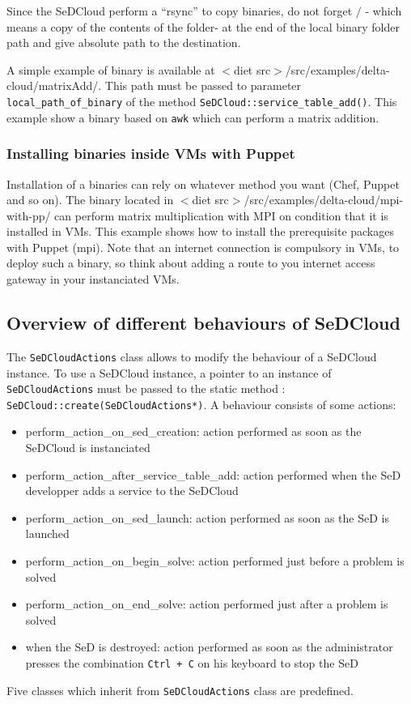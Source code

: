 Since the SeDCloud perform a ``rsync'' to copy binaries, do not forget
$/$ - which means a copy of the contents of the folder- at the end of
the local binary folder path and give absolute path to the
destination.

A simple example of binary is available at $<$diet
src$>$/src/examples/delta-cloud/matrixAdd/. This path must be passed
to parameter \texttt{local\_path\_of\_binary} of the method
\texttt{SeDCloud::service\_table\_add()}. This example show a binary
based on \texttt{awk} which can perform a matrix addition.

\subsubsection{Installing binaries inside VMs with Puppet}

Installation of a binaries can rely on whatever method you want (Chef,
Puppet and so on). The binary located in $<$diet
src$>$/src/examples/delta-cloud/mpi-with-pp/ can perform matrix
multiplication with MPI on condition that it is installed in VMs.
This example shows how to install the prerequisite packages with
Puppet (mpi). Note that an internet connection is compulsory in VMs,
to deploy such a binary, so think about adding a route to you internet
access gateway in your instanciated VMs.



\subsection{Overview of different behaviours of SeDCloud\label{sec:SeDCloudActions}}



The \texttt{SeDCloudActions} class allows to modify the behaviour of a
SeDCloud instance. To use a SeDCloud instance, a pointer to an
instance of \texttt{SeDCloudActions} must be passed to the static
method : \texttt{SeDCloud::create(SeDCloudActions*)}. A behaviour
consists of some actions:

\begin{itemize}
  \item perform\_action\_on\_sed\_creation: action performed as soon as the SeDCloud is instanciated
  \item perform\_action\_after\_service\_table\_add: action performed when the SeD developper adds a service to the SeDCloud
  \item perform\_action\_on\_sed\_launch: action performed as soon as the SeD is launched
  \item perform\_action\_on\_begin\_solve: action performed just before a problem is solved
  \item perform\_action\_on\_end\_solve: action performed just after a problem is solved
  \item when the SeD is destroyed: action performed as soon as the
    administrator presses the combination \texttt{Ctrl + C} on his keyboard to stop the SeD
\end{itemize}
Five classes which inherit from \texttt{SeDCloudActions} class are predefined.



